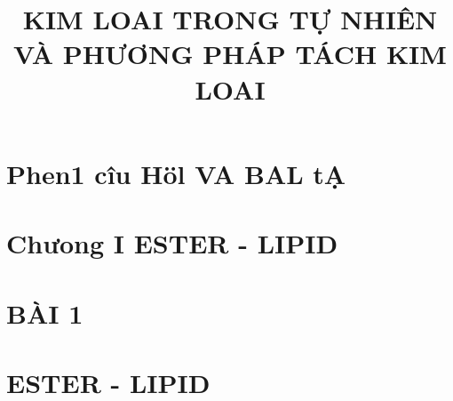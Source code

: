 \documentclass[10pt]{article}
\title{KIM LOAI TRONG TỰ NHIÊN VÀ PHƯƠNG PHÁP TÁCH KIM LOAI }
\author{}
\date{}
\begin{document}
\maketitle
\captionsetup{singlelinecheck=false}
\section*{Phen1 cîu Höl VA BAL tẠ}
\section*{Chưong I ESTER - LIPID}
\section*{BÀI 1}
\section*{ESTER - LIPID}
\end{document}
